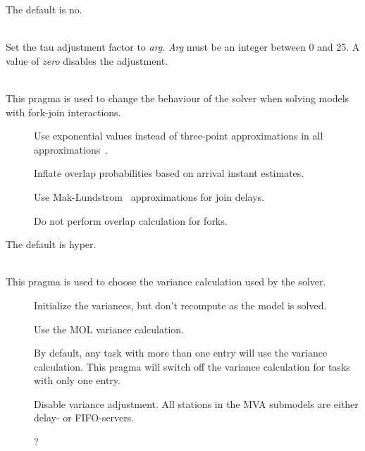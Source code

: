 \begin{description}
The default is no.
\item[\optarg{tau}{=\emph{arg}}]~\\
Set the tau adjustment factor to \emph{arg}.
\emph{Arg} must be an integer between 0 and 25.
A value of \emph{zero} disables the adjustment.
\item[\optarg{threads}{=\emph{arg}}]~\\
This pragma is used to change the behaviour of the solver when solving
models with fork-join interactions.
\begin{description}
\item[]
Use exponential values instead of three-point approximations in all approximations~\cite{perf:jiang-96}.
\item[]
Inflate overlap probabilities based on arrival instant estimates.
\item[]
Use Mak-Lundstrom~\cite{perf:mak-90} approximations for join delays.
\item[]
Do not perform overlap calculation for forks.
\end{description}
The default is hyper.
\item[\optarg{variance}{=\emph{arg}}]~\\
This pragma is used to choose the variance calculation used by the solver.
\begin{description}
\item[]
Initialize the variances, but don't recompute as the model is solved.
\item[]
Use the MOL variance calculation.
\item[]
By default, any task with more than one entry will use the variance calculation.  This pragma will switch off the variance calculation for tasks with only one entry.
\item[]
Disable variance adjustment.  All stations in the MVA submodels are either delay- or FIFO-servers.
\item[]
?
\end{description}

\end{description}
